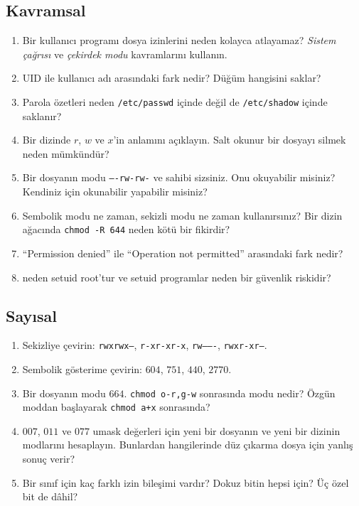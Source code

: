 \subsection*{Kavramsal}
\begin{enumerate}[leftmargin=1.6em]
  \item Bir kullanıcı programı dosya izinlerini neden kolayca atlayamaz? \emph{Sistem çağrısı} ve \emph{çekirdek modu} kavramlarını kullanın.
  \item UID ile kullanıcı adı arasındaki fark nedir? Düğüm hangisini saklar?
  \item Parola özetleri neden \texttt{/etc/passwd} içinde değil de \texttt{/etc/shadow} içinde saklanır?
  \item Bir dizinde $r$, $w$ ve $x$'in anlamını açıklayın. Salt okunur bir dosyayı silmek neden mümkündür?
  \item Bir dosyanın modu \texttt{----rw-rw-} ve sahibi sizsiniz. Onu okuyabilir misiniz? Kendiniz için okunabilir yapabilir misiniz?
  \item Sembolik modu ne zaman, sekizli modu ne zaman kullanırsınız? Bir dizin ağacında \texttt{chmod -R 644} neden kötü bir fikirdir?
  \item ``Permission denied'' ile ``Operation not permitted'' arasındaki fark nedir?
  \item {} neden setuid root'tur ve setuid programlar neden bir güvenlik riskidir?
\end{enumerate}

\subsection*{Sayısal}
\begin{enumerate}[leftmargin=1.6em,resume]
  \item Sekizliye çevirin: \texttt{rwxrwx---}, \texttt{r-xr-xr-x}, \texttt{rw-------}, \texttt{rwxr-xr--}.
  \item Sembolik gösterime çevirin: $604$, $751$, $440$, $2770$.
  \item Bir dosyanın modu $664$. \texttt{chmod o-r,g-w} sonrasında modu nedir? Özgün moddan başlayarak \texttt{chmod a+x} sonrasında?
  \item $007$, $011$ ve $077$ umask değerleri için yeni bir dosyanın ve yeni bir dizinin modlarını hesaplayın. Bunlardan hangilerinde düz çıkarma dosya için yanlış sonuç verir?
  \item Bir sınıf için kaç farklı izin bileşimi vardır? Dokuz bitin hepsi için? Üç özel bit de dâhil?
\end{enumerate}

